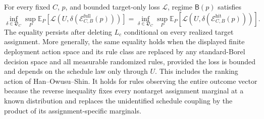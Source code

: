 For every fixed \(C\), \(p\), and bounded target-only loss \(\mathcal L\), regime \(\mathsf B(p)\) satisfies
\[
\inf_{\delta\in\mathfrak D_C}\sup_P\mathbb E_P[\mathcal L(U,\delta(\mathcal E_{C,B}^{\mathrm{full}}(p)))]
=
\inf_{\delta\in\mathfrak D_C}\sup_P\mathbb E_P[\mathcal L(U,\delta(\mathcal E_{C,B}^{\mathrm{hit}}(p)))].
\]
The equality persists after deleting \(L_c\) conditional on every realized target assignment.  More generally, the same equality holds when the displayed finite deployment action space and its rule class are replaced by any standard-Borel decision space and all measurable randomized rules, provided the loss is bounded and depends on the schedule law only through \(U\).  This includes the ranking action of Han--Owusu--Shin.  It holds for rules observing the entire outcome vector because the reverse inequality fixes every nontarget assignment marginal at a known distribution and replaces the unidentified schedule coupling by the product of its assignment-specific marginals.